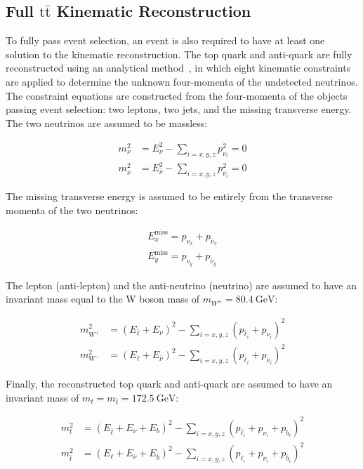 \subsection{Full \ensuremath{\mathrm{t\bar{t}}} Kinematic Reconstruction}
To fully pass event selection, an event is also required to have at least one solution to the \ttbar kinematic reconstruction.
The top quark and anti-quark are fully reconstructed using an analytical method~\cite{Sonnenschein:2006ud}, in which eight kinematic constraints are applied to determine the unknown four-momenta of the undetected neutrinos.
The constraint equations are constructed from the four-momenta of the objects passing event selection: two leptons, two jets, and the missing transverse energy. 
The two neutrinos are assumed to be massless:
\begin{linenomath*}
\begin{align}
m_{\nu}^2 &= E_{\nu}^2 - \sum_{i = x, y, z} p_{\nu_i}^2 = 0 \\
m_{\bar{\nu}}^2 &= E_{\bar{\nu}}^2 - \sum_{i = x, y, z} p_{\bar{\nu}_i}^2 = 0
\end{align}
\end{linenomath*}
The missing transverse energy is assumed to be entirely from the transverse momenta of the two neutrinos:
\begin{linenomath*}
\begin{align}
E_{x}^{\text{miss}}=p_{\nu_x}+p_{\bar{\nu}_x} \\
E_{y}^{\text{miss}}=p_{\nu_y}+p_{\bar{\nu}_y}
\end{align}
\end{linenomath*}
The lepton (anti-lepton) and the anti-neutrino (neutrino) are assumed to have an invariant mass equal to the W boson mass of $m_{W^\pm} = \SI{80.4}{\GeV}$:
\begin{linenomath*}
\begin{align}
m_{W^{+}}^2 &=\left(E_{\bar{\ell}}+E_\nu\right)^2- \sum_{i = x, y, z} \left(p_{\bar{\ell}_i}+p_{\nu_i}\right)^2  \\
m_{W^{-}}^2 &=\left(E_{\ell}+E_{\bar{\nu}}\right)^2- \sum_{i = x, y, z} \left(p_{\ell_i}+p_{\bar{\nu}_i}\right)^2
\end{align}
\end{linenomath*}
Finally, the reconstructed top quark and anti-quark are assumed to have an invariant mass of $m_{t} = m_{\bar{t}} = \SI{172.5}{\GeV}$:
\begin{linenomath*}
\begin{align}
m_t^2 &= \left(E_{\bar{\ell}}+E_\nu+E_b\right)^2- \sum_{i = x, y, z} \left(p_{\bar{\ell}_i}+p_{\nu_i}+p_{b_i}\right)^2 \\
m_{\bar{t}}^2 &= \left(E_{\ell}+E_{\bar{\nu}}+E_{\bar{b}}\right)^2 - \sum_{i = x, y, z} \left(p_{\ell_i}+p_{\bar{\nu}_i}+p_{\bar{b}_i}\right)^2 
\end{align}
\end{linenomath*}

